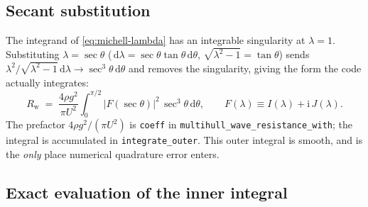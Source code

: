 \documentclass[11pt]{article}
\newcommand{\ii}{\mathrm{i}}
\newcommand{\dd}{\,\mathrm{d}}
\newcommand{\Rw}{R_{\mathrm{w}}}
\begin{document}
\subsection{Secant substitution}

The integrand of \eqref{eq:michell-lambda} has an integrable singularity at
$\lambda = 1$. Substituting $\lambda = \sec\theta$
($\dd\lambda = \sec\theta\tan\theta\dd\theta$,
$\sqrt{\lambda^2-1} = \tan\theta$) sends
$\lambda^2/\sqrt{\lambda^2-1}\dd\lambda \to \sec^{3}\theta\dd\theta$ and removes
the singularity, giving the form the code actually integrates:
\begin{equation}
  \boxed{\;
  \Rw \;=\; \frac{4\rho g^{2}}{\pi U^{2}}
    \int_{0}^{\pi/2}
      \bigl|F(\sec\theta)\bigr|^{2}\,\sec^{3}\theta \dd\theta,
  \qquad
  F(\lambda) \equiv I(\lambda) + \ii\,J(\lambda). \;}
  \label{eq:michell-theta}
\end{equation}
The prefactor $4\rho g^{2}/(\pi U^{2})$ is \texttt{coeff} in
\texttt{multihull\_wave\_resistance\_with}; the integral is accumulated in
\texttt{integrate\_outer}. This outer integral is smooth, and is the
\emph{only} place numerical quadrature error enters.

\subsection{Exact evaluation of the inner integral}
\label{sec:inner}
\end{document}
